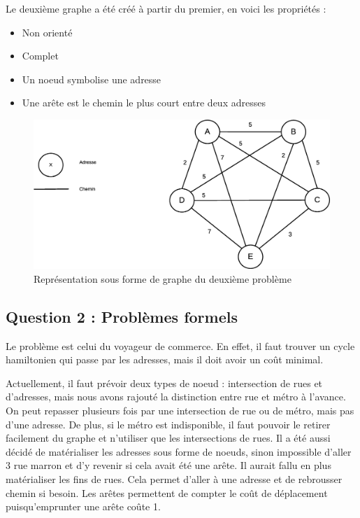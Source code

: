     \newpage

    Le deuxième graphe a été créé à partir du premier, en voici les propriétés :

    \begin{itemize}
     \item Non orienté
     \item Complet
     \item Un noeud symbolise une adresse
     \item Une arête est le chemin le plus court entre deux adresses
    \end{itemize}


    \begin{figure}[h!]
            \centering
                \includegraphics[width=1\textwidth]{images/graphe2.eps}
            \caption{Représentation sous forme de graphe du deuxième problème}
            \label{fig:graphe} %
    \end{figure}

    \clearpage


  \subsection{Question 2 : Problèmes formels}
    Le problème est celui du voyageur de commerce. En effet, il faut trouver un cycle hamiltonien qui passe par les adresses, mais il doit avoir un coût minimal.

    Actuellement, il faut prévoir deux types de noeud : intersection de rues et d'adresses, mais nous avons rajouté la distinction entre rue et métro à l'avance. On peut repasser plusieurs fois par une intersection de rue ou de métro, mais pas d'une adresse. De plus, si le métro est indisponible, il faut pouvoir le retirer facilement du graphe et n'utiliser que les intersections de rues. Il a été aussi décidé de matérialiser les adresses sous forme de noeuds, sinon impossible d'aller 3 rue marron et d'y revenir si cela avait été une arête. Il aurait fallu en plus matérialiser les fins de rues. Cela permet d'aller à une adresse et de rebrousser chemin si besoin.
    Les arêtes permettent de compter le coût de déplacement puisqu'emprunter une arête coûte 1.

